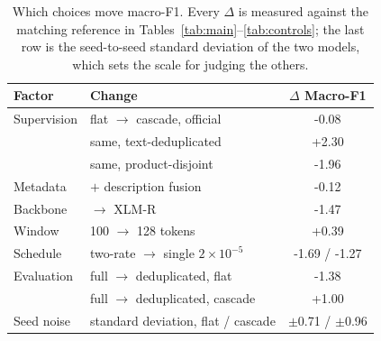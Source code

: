 \begin{table}[t]
\caption{Which choices move macro-F1. Every $\Delta$ is measured against the matching reference in Tables~\ref{tab:main}--\ref{tab:controls}; the last row is the seed-to-seed standard deviation of the two models, which sets the scale for judging the others.}
\label{tab:effects}
\centering
\small
\setlength{\tabcolsep}{4pt}
\begin{tabular}{@{}llc@{}}
\toprule
Factor & Change & $\Delta$ Macro-F1 \\
\midrule
Supervision & flat $\rightarrow$ cascade, official & -0.08 \\
 & same, text-deduplicated & +2.30 \\
 & same, product-disjoint & -1.96 \\
Metadata & $+$ description fusion & -0.12 \\
Backbone & \phobert{} $\rightarrow$ XLM-R & -1.47 \\
Window & 100 $\rightarrow$ 128 tokens & +0.39 \\
Schedule & two-rate $\rightarrow$ single $2\times10^{-5}$ & -1.69 / -1.27 \\
Evaluation & full $\rightarrow$ deduplicated, flat & -1.38 \\
 & full $\rightarrow$ deduplicated, cascade & +1.00 \\
\midrule
Seed noise & standard deviation, flat / cascade & $\pm$0.71 / $\pm$0.96 \\
\bottomrule
\end{tabular}
\end{table}
